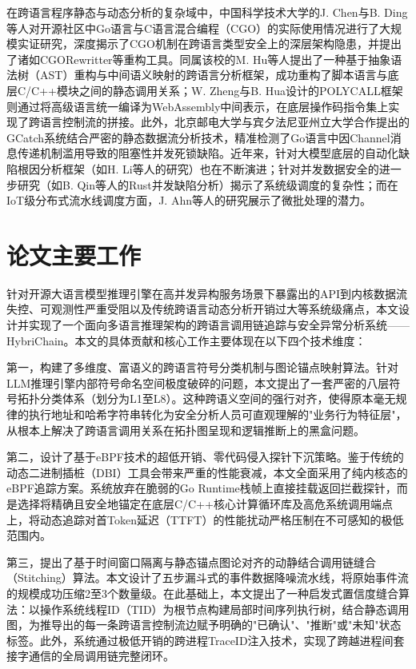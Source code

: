 在跨语言程序静态与动态分析的复杂域中，中国科学技术大学的J. Chen与B. Ding等人对开源社区中Go语言与C语言混合编程（CGO）的实际使用情况进行了大规模实证研究，深度揭示了CGO机制在跨语言类型安全上的深层架构隐患，并提出了诸如CGORewritter等重构工具。同属该校的M. Hu等人提出了一种基于抽象语法树（AST）重构与中间语义映射的跨语言分析框架，成功重构了脚本语言与底层C/C++模块之间的静态调用关系；W. Zheng与B. Hua设计的POLYCALL框架则通过将高级语言统一编译为WebAssembly中间表示，在底层操作码指令集上实现了跨语言控制流的拼接。此外，北京邮电大学与宾夕法尼亚州立大学合作提出的GCatch系统结合严密的静态数据流分析技术，精准检测了Go语言中因Channel消息传递机制滥用导致的阻塞性并发死锁缺陷。近年来，针对大模型底层的自动化缺陷根因分析框架（如H. Li等人的研究）也在不断演进；针对并发数据安全的进一步研究（如B. Qin等人的Rust并发缺陷分析）揭示了系统级调度的复杂性；而在IoT级分布式流水线调度方面，J. Ahn等人的研究展示了微批处理的潜力。

\section{论文主要工作}

针对开源大语言模型推理引擎在高并发异构服务场景下暴露出的API到内核数据流失控、可观测性严重受阻以及传统跨语言动态分析开销过大等系统级痛点，本文设计并实现了一个面向多语言推理架构的跨语言调用链追踪与安全异常分析系统——HybriChain。本文的具体贡献和核心工作主要体现在以下四个技术维度：

第一，构建了多维度、富语义的跨语言符号分类机制与图论锚点映射算法。针对LLM推理引擎内部符号命名空间极度破碎的问题，本文提出了一套严密的八层符号拓扑分类体系（划分为L1至L8）。这种跨语义空间的强行对齐，使得原本毫无规律的执行地址和哈希字符串转化为安全分析人员可直观理解的"业务行为特征层"，从根本上解决了跨语言调用关系在拓扑图呈现和逻辑推断上的黑盒问题。

第二，设计了基于eBPF技术的超低开销、零代码侵入探针下沉策略。鉴于传统的动态二进制插桩（DBI）工具会带来严重的性能衰减，本文全面采用了纯内核态的eBPF追踪方案。系统放弃在脆弱的Go Runtime栈帧上直接挂载返回拦截探针，而是选择将精确且安全地锚定在底层C/C++核心计算循环库及高危系统调用端点上，将动态追踪对首Token延迟（TTFT）的性能扰动严格压制在不可感知的极低范围内。

第三，提出了基于时间窗口隔离与静态锚点图论对齐的动静结合调用链缝合（Stitching）算法。本文设计了五步漏斗式的事件数据降噪流水线，将原始事件流的规模成功压缩2至3个数量级。在此基础上，本文提出了一种启发式置信度缝合算法：以操作系统线程ID（TID）为根节点构建局部时间序列执行树，结合静态调用图，为推导出的每一条跨语言控制流边赋予明确的"已确认"、"推断"或"未知"状态标签。此外，系统通过极低开销的跨进程TraceID注入技术，实现了跨越进程间套接字通信的全局调用链完整闭环。

